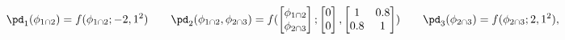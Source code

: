 \begin{equation}
  \pd_{1}(\phi_{1 \cap 2}) = f(\phi_{1 \cap 2}; -2, 1^2) 
  \qquad
  \pd_{2}(\phi_{1 \cap 2}, \phi_{2 \cap 3}) = f(
    \begin{bmatrix} \phi_{1 \cap 2} \\ \phi_{2 \cap 3}\end{bmatrix};
    \begin{bmatrix} 0 \\ 0 \end{bmatrix},
    \begin{bmatrix} 1 & 0.8 \\ 0.8 & 1 \end{bmatrix}
  )
  \qquad
  \pd_{3}(\phi_{2 \cap 3}) = f(\phi_{2 \cap 3}; 2, 1^2),
  \label{eqn:marginal-gaussian-example}
\end{equation}